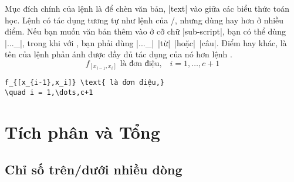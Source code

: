 \documentclass[11pt,leqno,titlepage,openany]{amsldoc}[1999/12/13]
\begin{document}
Mục đích chính của lệnh  là để chèn văn bản, |text| vào giữa
các biểu thức toán học. Lệnh có tác dụng tương tự như lệnh 
của \latex/, nhưng dùng  hay hơn ở nhiều điểm.
Nếu bạn muốn văn bản thêm vào ở cỡ chữ |sub-script|, bạn có thể dùng
|..._{}|, trong khi với , bạn phải dùng
|..._{\mbox{\scriptsize| |từ| |hoặc| |câu}}|. Điểm hay khác, là tên của
lệnh  phản ánh được đầy đủ tác dụng của nó hơn lệnh .
\begin{equation}
f_{[x_{i-1},x_i]} \text{ là đơn điệu,}
\quad i = 1,\dots,c+1
\end{equation}
\begin{verbatim}
f_{[x_{i-1},x_i]} \text{ là đơn điệu,}
\quad i = 1,\dots,c+1
\end{verbatim}

\chapter{Tích phân và Tổng}

\section{Chỉ số trên/dưới nhiều dòng}
\end{document}
